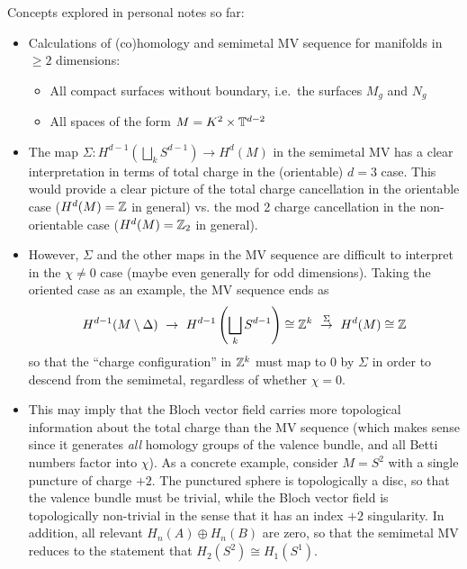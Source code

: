 

{\color{red}
Concepts explored in personal notes so far:
\begin{itemize}
	\item Calculations of (co)homology and semimetal MV sequence for manifolds in $\geq2$ dimensions:
	\begin{itemize}
		\item All compact surfaces without boundary, i.e.\ the surfaces $M_g$ and $N_g$
		
		\item All spaces of the form $M = K^2 \times \mathbb{T}^{d-2}$
	\end{itemize}
	
	\item The map $\Sigma:H^{d-1}(\bigsqcup_{k}S^{d-1})\to H^d(M)$ in the semimetal MV has a clear interpretation in terms of total charge in the (orientable) $d=3$ case. This would provide a clear picture of the total charge cancellation in the orientable case ($H^d(M) = \mathbb{Z}$ in general) vs. the mod 2 charge cancellation in the non-orientable case ($H^d(M) = \mathbb{Z}_2$ in general).
	
	\item However, $\Sigma$ and the other maps in the MV sequence are difficult to interpret in the $\chi\neq 0$ case (maybe even generally for odd dimensions). Taking the oriented case as an example, the MV sequence ends as
	\begin{align*}
		H^{d-1}(M\setminus\Delta)\ \rightarrow\ H^{d-1}\left(\bigsqcup_{k}S^{d-1}\right) \cong \Z^k\ \overset{\Sigma}{\rightarrow}\ H^d(M) \cong \Z
	\end{align*}
	so that the ``charge configuration'' in $\mathbb{Z}^k$ must map to 0 by $\Sigma$ in order to descend from the semimetal, regardless of whether $\chi=0$.
	
	\item This may imply that the Bloch vector field carries more topological information about the total charge than the MV sequence (which makes sense since it generates \emph{all} homology groups of the valence bundle, and all Betti numbers factor into $\chi$). As a concrete example, consider $M=S^2$ with a single puncture of charge $+2$. The punctured sphere is topologically a disc, so that the valence bundle must be trivial, while the Bloch vector field is topologically non-trivial in the sense that it has an index $+2$ singularity. In addition, all relevant $H_n(A)\oplus H_n(B)$ are zero, so that the semimetal MV reduces to the statement that $H_2(S^2)\cong H_1(S^1)$.
	

\end{itemize}}
